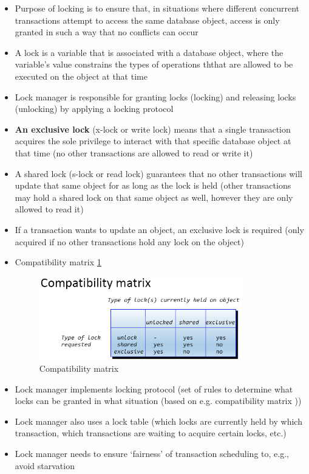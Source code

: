 \documentclass{report}
\begin{document}
	\begin{itemize}
		\item Purpose of locking is to ensure that, in situations where different concurrent transactions attempt to access the  same database object, access is only granted in such a way that no conflicts can occur
		\item A lock is a variable that is associated with a database object, where the variable’s value constrains the types of operations ththat are allowed to be executed on the object at that time
		\item Lock manager is responsible for granting locks (locking) and releasing locks (unlocking) by applying a locking protocol
		\item \textbf{An exclusive lock} (x-lock or write lock) means that a single transaction acquires the sole privilege to interact with that specific database object at that time (no other transactions are allowed to read or write it)
		\item A {shared lock} (s-lock or read lock) guarantees that no other transactions will update that same object for as long as the lock is held (other transactions may hold a shared lock on that same object as well, however they are only allowed to read it)
		\item If a transaction wants to update an object, an exclusive lock is required (only acquired if no other transactions hold any lock on the object)
		\item Compatibility matrix \ref{fig:Compatibility-matrix}
		\begin{figure}
			\includegraphics[width=250pt]{./images/Compatibility-matrix.png}
			\caption{\label{fig:Compatibility-matrix}Compatibility matrix}
		\end{figure}
		\item Lock manager implements locking protocol (set of rules to determine what locks can be granted in what situation (based on e.g. compatibility matrix ))
		\item Lock manager also uses a lock table (which locks are currently held by which transaction, which transactions are waiting to acquire certain locks, etc.)
		\item Lock manager needs to ensure ‘fairness’ of transaction scheduling to, e.g., avoid starvation        
	\end{itemize}
\end{document}

